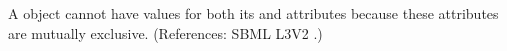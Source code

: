 A \Species object cannot have values for both its
 and  attributes because
these attributes are mutually exclusive.  (References: SBML L3V2
.)
